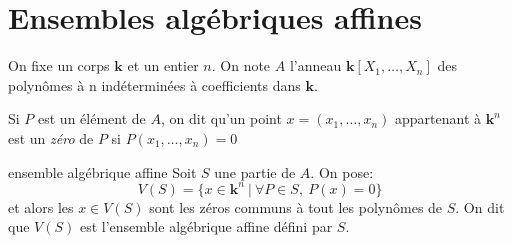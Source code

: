 \newcommand{\korps}{\textbf{k}}

\section{Ensembles algébriques affines}

On fixe un corps $\korps$ et un entier $n$. 
On note $A$ l'anneau $\korps[X_1, \dots, X_n]$ des polynômes à n indéterminées à coefficients dans $\korps$.

Si $P$ est un élément de $A$, on dit qu'un point $x = (x_1, \dots, x_n)$ 
appartenant à $\korps^n$ est un \textit{zéro} de $P$ si $P(x_1, \dots, x_n) = 0$

\begin{definition}{ensemble algébrique affine}{}
    Soit $S$ une partie de $A$. On pose:
    \[V(S) = \{x \in \korps^n ~ | ~ \forall P \in S, ~ P(x) = 0\}\]
    et alors les $x \in V(S)$ sont les zéros communs à tout les polynômes de $S$.
    On dit que $V(S)$ est l'ensemble algébrique affine défini par $S$.
\end{definition}